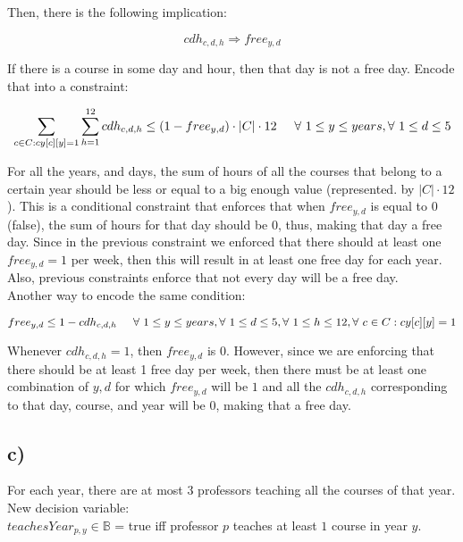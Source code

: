 \documentclass[11pt, oneside]{article}   	%
\begin{document}
Then, there is the following implication:

$$cdh_{c,d,h} \Longrightarrow free_{y,d}$$

If there is a course in some day and hour, then that day is not a free day. Encode that into a constraint:

$$\sum_{c \in C : cy[c][y] = 1} \sum_{h = 1}^{12} cdh_{c,d,h} \leq (1 - free_{y,d}) \cdot |C| \cdot 12 \hspace{5 mm} \forall{}\ 1 \leq y \leq years, \forall{}\ 1 \leq d \leq 5$$

For all the years, and days, the sum of hours of all the courses that belong to a certain year should be less or equal to a big enough value (represented. by $|C| \cdot 12$). This is a conditional constraint that enforces that when $free_{y,d}$ is equal to $0$ (false), the sum of hours for that day should be $0$, thus, making that day a free day. Since in the previous constraint we enforced that there should at least one $free_{y,d} = 1$ per week, then this will result in at least one free day for each year. Also, previous constraints enforce that not every day will be a free day.\\

Another way to encode the same condition:

$$free_{y,d} \leq 1 - cdh_{c,d,h} \hspace{5 mm} \forall{}\ 1 \leq y \leq years, \forall{}\ 1 \leq d \leq 5,  \forall{}\ 1 \leq h \leq 12, \forall{}\ c \in C : cy[c][y] = 1$$

Whenever $cdh_{c,d,h} = 1$, then $free_{y,d}$ is $0$. However, since we are enforcing that there should be at least 1 free day per week, then there must be at least one combination of $y,d$ for which $free_{y,d}$ will be $1$ and all the $cdh_{c,d,h}$ corresponding to that day, course, and year will be 0, making that a free day.

\subsection{c)}

\hspace{\parindent}For each year, there are at most $3$ professors teaching all the courses of that year.\\

New decision variable:\\

$teachesYear_{p,y} \in \mathbb{B}$ = true iff professor $p$ teaches at least $1$ course in year $y$.\\
\end{document}
